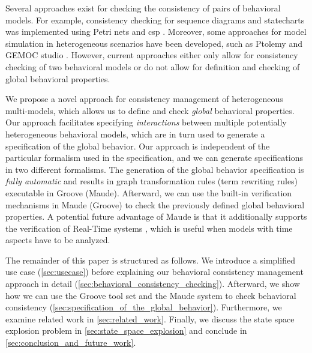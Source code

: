 \documentclass{jot}
\begin{document}
Several approaches exist for checking the consistency of pairs of behavioral models.
For example, consistency checking for sequence diagrams and statecharts was implemented using Petri nets \cite{yaoConsistencyCheckingUML2006} and \gls*{csp} \cite{kusterExplicitBehavioralConsistency2003}.
Moreover, some approaches for model simulation in heterogeneous scenarios have been developed, such as Ptolemy \cite{ekerTamingHeterogeneityPtolemy2003, leeDisciplinedHeterogeneousModeling2010} and GEMOC studio \cite{deantoniModelingBehavioralSemantics2016, varalarsenBCoolBehavioralCoordination2016}.
However, current approaches either only allow for consistency checking of two behavioral models or do not allow for definition and checking of global behavioral properties.

We propose a novel approach for consistency management of heterogeneous multi-models, which allows us to define and check \emph{global} behavioral properties.
Our approach facilitates specifying \emph{interactions} between multiple potentially heterogeneous behavioral models, which are in turn used to generate a specification of the global behavior.
Our approach is independent of the particular formalism used in the specification, and we can generate specifications in two different formalisms.
The generation of the global behavior specification is \textit{fully automatic} and results in graph transformation rules (term rewriting rules) executable in Groove (Maude).
Afterward, we can use the built-in verification mechanisms in Maude (Groove) to check the previously defined global behavioral properties.
A potential future advantage of Maude is that it additionally supports the verification of Real-Time systems \cite{olveczkySemanticsPragmaticsRealTime2007, duranVerifyingTimedBPMN2017}, which is useful when models with time aspects have to be analyzed.

The remainder of this paper is structured as follows.
We introduce a simplified use case (\autoref{sec:usecase}) before explaining our behavioral consistency management approach in detail (\autoref{sec:behavioral_consistency_checking}).
Afterward, we show how we can use the Groove tool set and the Maude system to check behavioral consistency (\autoref{sec:specification_of_the_global_behavior}).
Furthermore, we examine related work in \autoref{sec:related_work}.
Finally, we discuss the state space explosion problem in \autoref{sec:state_space_explosion} and conclude in \autoref{sec:conclusion_and_future_work}.
\end{document}
